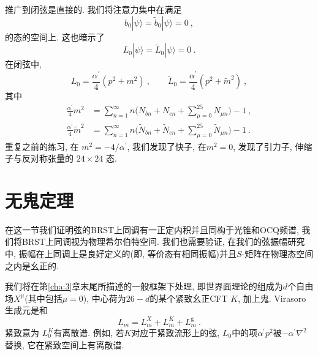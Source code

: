 推广到闭弦是直接的. 我们将注意力集中在满足
\begin{equation}
b_{0}|\psi\rangle=\tilde{b}_{0}|\psi\rangle=0 \:, \label{4.3.29}
\end{equation}
的态的空间上. 这也暗示了
\begin{equation}
L_{0}|\psi\rangle=\tilde{L}_{0}|\psi\rangle=0 \:. \label{4.3.30}
\end{equation}
在闭弦中,
\begin{equation}
L_{0}=\frac{\alpha^{\prime}}{4} (p^{2}+m^{2}) \:, \qquad \tilde{L}_{0}=\frac{\alpha^{\prime}}{4}(p^{2}+\tilde{m}^{2}) \:, \label{4.3.31}
\end{equation}
其中
\begin{subequations} \label{4.3.32}
\begin{align} 
\frac{\alpha^{\prime}}{4} m^{2}&=\sum_{n=1}^{\infty} n\Biggl(N_{b n}+N_{c n}+\sum_{\mu=0}^{25} N_{\mu n}\Biggr)-1 \:, \label{4.3.32a}\\
\frac{\alpha^{\prime}}{4} \tilde{m}^{2}&=\sum_{n=1}^{\infty} n\Biggl(\tilde{N}_{b n}+\tilde{N}_{c n}+\sum_{\mu=0}^{25} \tilde{N}_{\mu n}\Biggr)-1
\:. \label{4.3.32b}
\end{align}
\end{subequations}
重复之前的练习, 在 $m^{2}=-4 / \alpha^{\prime}$, 我们发现了快子, 在$m^{2}=0$, 发现了引力子, 伸缩子与反对称张量的 $24 \times 24$ 态.

\section{\texorpdfstring{无鬼定理}{4.4 The no-ghost theorem}} \label{sec:4.4}

在这一节我们证明弦的BRST上同调有一正定内积并且同构于光锥和OCQ频谱, 我们将BRST上同调视为物理希尔伯特空间. 我们也需要验证, 在我们的弦振幅研究中, 振幅在上同调上是良好定义的(即, 等价态有相同振幅)并且$S$-矩阵在物理态空间之内是幺正的.

我们将在第\ref{cha:3}章末尾所描述的一般框架下处理, 即世界面理论的组成为$d$个自由场$X^{\mu}$(其中包括$\mu=0$), 中心荷为$26-d$的某个紧致幺正CFT $K$, 加上鬼. Virasoro生成元是和
\begin{equation}
L_{m}=L_{m}^{X}+L_{m}^{K}+L_{m}^{\mathrm{g}} \:. \label{4.4.1}
\end{equation}
紧致意为 $L_{0}^{K}$有离散谱. 例如, 若$K$对应于紧致流形上的弦, $L_{0}$中的项$\alpha^{\prime} p^{2}$被$-\alpha^{\prime} \nabla^{2}$替换, 它在紧致空间上有离散谱.

